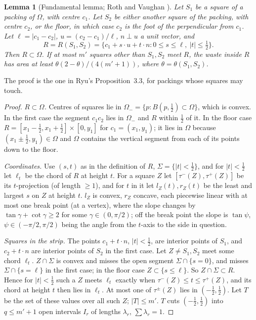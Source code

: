 \documentclass[11pt,letterpaper]{amsart}
\theoremstyle{plain}
\newtheorem{lemma}[theorem]{Lemma}
\theoremstyle{definition}
\theoremstyle{remark}
\begin{document}
\begin{lemma}[Fundamental lemma; Roth and Vaughan \cite{RV78}]\label{lem:fundamental}
Let $S_1$ be a square of a packing of $\Omega$, with centre $c_1$. Let $S_2$ be either another square of the packing, with centre $c_2$, or the floor, in which case $c_2$ is the foot of the perpendicular from $c_1$. Let $\ell=|c_1-c_2|$, $u=(c_2-c_1)/\ell$, $n\perp u$ a unit vector, and
\[
R=R(S_1,S_2)=\{c_1+s\cdot u+t\cdot n:0\le s\le\ell,\ |t|\le\tfrac12\}.
\]
Then $R\subset\Omega$. If at most $m'$ squares other than $S_1,S_2$ meet $R$, the waste inside $R$ has area at least $\theta(2-\theta)/(4(m'+1))$, where $\theta=\theta(S_1,S_2)$.
\end{lemma}
The proof is the one in Ryu's \cite{Ryu26b} Proposition~3.3, for packings whose squares may touch.
\begin{proof}
\emph{$R\subset\Omega$.} Centres of squares lie in $\Omega_- =\{p:B(p,\tfrac12)\subset\Omega\}$, which is convex. In the first case the segment $c_1c_2$ lies in $\Omega_-$ and $R$ within $\tfrac12$ of it. In the floor case $R=[x_1-\tfrac12,x_1+\tfrac12]\times[0,y_1]$ for $c_1=(x_1,y_1)$; it lies in $\Omega$ because $(x_1\pm\tfrac12,y_1)\in\Omega$ and $\Omega$ contains the vertical segment from each of its points down to the floor.

\emph{Coordinates.} Use $(s,t)$ as in the definition of $R$, $\Sigma=\{|t|<\tfrac12\}$, and for $|t|<\tfrac12$ let $\ell_t$ be the chord of $R$ at height $t$. For a square $Z$ let $[\tau^-(Z),\tau^+(Z)]$ be its $t$-projection (of length $\ge1$), and for $t$ in it let $l_Z(t),r_Z(t)$ be the least and largest $s$ on $Z$ at height $t$. $l_Z$ is convex, $r_Z$ concave, each piecewise linear with at most one break point (at a vertex), where the slope changes by $\tan\gamma+\cot\gamma\ge2$ for some $\gamma\in(0,\pi/2)$; off the break point the slope is $\tan\psi$, $\psi\in(-\pi/2,\pi/2)$ being the angle from the $t$-axis to the side in question.

\emph{Squares in the strip.} The points $c_1+t\cdot n$, $|t|<\tfrac12$, are interior points of $S_1$, and $c_2+t\cdot n$ are interior points of $S_2$ in the first case. Let $Z\ne S_1,S_2$ meet some chord $\ell_t$. $Z\cap\Sigma$ is convex and misses the open segment $\Sigma\cap\{s=0\}$, and misses $\Sigma\cap\{s=\ell\}$ in the first case; in the floor case $Z\subset\{s\le\ell\}$. So $Z\cap\Sigma\subset R$. Hence for $|t|<\tfrac12$ such a $Z$ meets $\ell_t$ exactly when $\tau^-(Z)\le t\le\tau^+(Z)$, and its chord at height $t$ then lies in $\ell_t$. At most one of $\tau^\pm(Z)$ lies in $(-\tfrac12,\tfrac12)$. Let $T$ be the set of these values over all such $Z$; $|T|\le m'$. $T$ cuts $(-\tfrac12,\tfrac12)$ into $q\le m'+1$ open intervals $I_r$ of lengths $\lambda_r$, $\sum\lambda_r=1$.


\end{proof}
\end{document}

